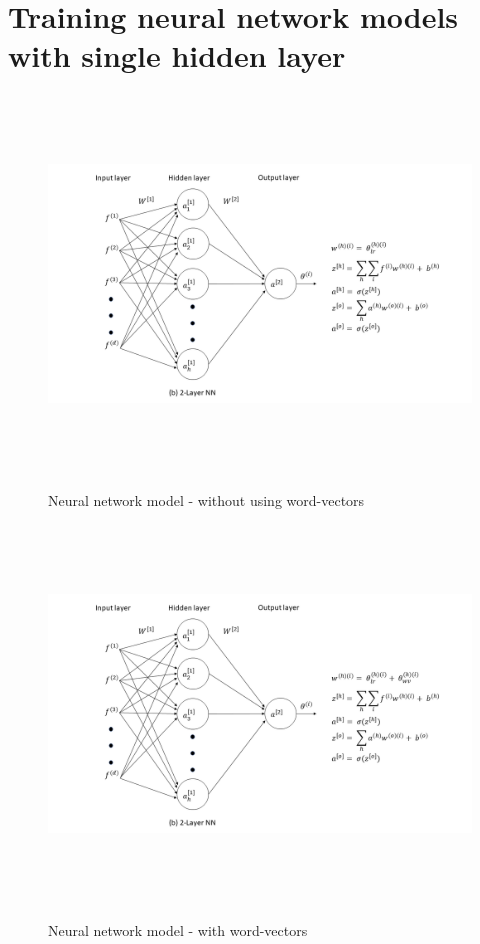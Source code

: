\newpage
\section{Training neural network models with single hidden layer}

\begin{figure}[htbp]
\centering
\includegraphics[width=16cm, height=10cm]{images/nn1.png}\\
\centering
\caption{Neural network model - without using word-vectors}
\label{fig:foo}
\end{figure}

\begin{figure}[htbp]
\centering
\includegraphics[width=16cm, height=10cm]{images/nn2.png}\\
\centering
\caption{Neural network model - with word-vectors}
\label{fig:foo}
\end{figure}

